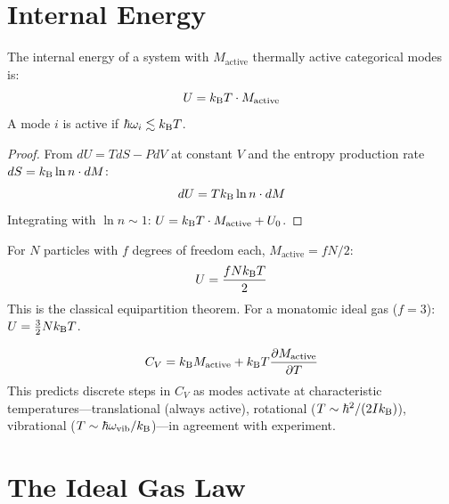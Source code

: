 \section{Internal Energy}
\label{sec:energy}

\begin{theorem}
\label{thm:energy}
The internal energy of a system with $M_{\mathrm{active}}$ thermally active categorical modes is:
\begin{equation}
    U = k_{\mathrm{B}} T \cdot M_{\mathrm{active}}
\end{equation}
A mode $i$ is active if $\hbar\omega_i \lesssim k_{\mathrm{B}} T$.
\end{theorem}

\begin{proof}
From $dU = TdS - PdV$ at constant $V$ and the entropy production rate $dS = k_{\mathrm{B}} \ln n \cdot dM$:
\begin{equation}
    dU = T k_{\mathrm{B}} \ln n \cdot dM
\end{equation}
Integrating with $\ln n \sim 1$: $U = k_{\mathrm{B}} T \cdot M_{\mathrm{active}} + U_0$.
\end{proof}

\begin{corollary}
For $N$ particles with $f$ degrees of freedom each, $M_{\mathrm{active}} = fN/2$:
\begin{equation}
    U = \frac{f N k_{\mathrm{B}} T}{2}
\end{equation}
This is the classical equipartition theorem. For a monatomic ideal gas ($f = 3$): $U = \tfrac{3}{2}Nk_{\mathrm{B}} T$.
\end{corollary}

\begin{corollary}
\begin{equation}
    C_V = k_{\mathrm{B}} M_{\mathrm{active}} + k_{\mathrm{B}} T \frac{\partial M_{\mathrm{active}}}{\partial T}
\end{equation}
This predicts discrete steps in $C_V$ as modes activate at characteristic temperatures---translational (always active), rotational ($T \sim \hbar^2/(2Ik_{\mathrm{B}})$), vibrational ($T \sim \hbar\omega_{\mathrm{vib}}/k_{\mathrm{B}}$)---in agreement with experiment.
\end{corollary}

\section{The Ideal Gas Law}
\label{sec:ideal_gas}

